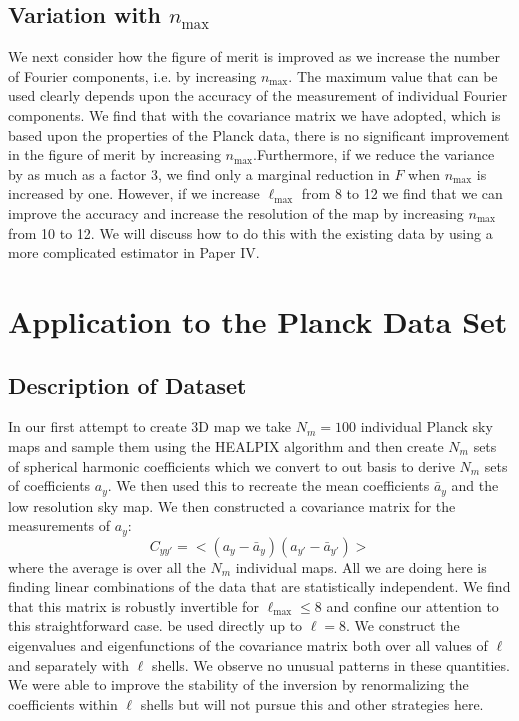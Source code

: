 \documentclass[useAMS,usenatbib,a4paper]{mn2e}
\begin{document}
\subsection{Variation with $n_\mathrm{max}$}
We next consider how the figure of merit is improved as we increase the number of Fourier components, i.e. by increasing $n_\mathrm{max}$. The maximum value that can be used clearly depends upon the accuracy of the measurement of individual Fourier components. We find that with the covariance matrix we have adopted, which is based upon the properties of the Planck data, there is no significant improvement in the figure of merit by increasing $n_\mathrm{max}$.Furthermore, if we reduce the variance by as much as a factor 3, we find only a marginal reduction in $F$ when $n_\mathrm{max}$ is increased by one. However, if we increase $\ell_\mathrm{max}$ from 8 to 12 we find that we can improve the accuracy and increase the resolution of the map by increasing $n_\mathrm{max}$ from 10 to 12. We will discuss how to do this with the existing data by using a more complicated estimator in Paper IV.
\section{Application to the Planck Data Set}
\subsection{Description of Dataset}
In our first attempt to create 3D map we take $N_m=100$ individual Planck sky maps and sample them using the HEALPIX algorithm and then create $N_m$ sets of spherical harmonic coefficients which we convert to out basis to derive $N_m$ sets of coefficients $a_y$. We then used this to recreate the mean coefficients $\bar{a}_y$ and the low resolution sky map. We then constructed a covariance matrix for the measurements of $a_y$:
\begin{equation}
C_{yy'}=<(a_y-\bar{a}_y)(a_{y'}-\bar{a}_{y'})>
\end{equation}
where the average is over all the $N_m$ individual maps. All we are doing here is finding linear combinations of the data that are statistically independent. We find that this matrix is robustly invertible for $\ell_\mathrm{max}\le8$ and confine our attention to this straightforward case. be used directly up to $\ell=8$. We construct the eigenvalues and eigenfunctions of the covariance matrix both over all values of $\ell$ and separately with $\ell$ shells. We observe no unusual patterns in these quantities. We were able to improve the stability of the inversion by renormalizing the coefficients within $\ell$ shells but will not pursue this and other strategies here. 
\end{document}
